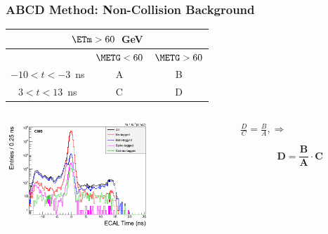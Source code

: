 \documentclass{beamer}
\begin{document}
\begin{frame}
\frametitle{ABCD Method: Non-Collision Background}
 \begin{minipage}[t]{0.8\paperwidth}
\begin{tcolorbox}[colback=blue!5,colframe=UMN@Gold!40,title=\textcolor{UMN@Maroon}{\textcolor{UMN@Maroon}{\textbf{Non-Collision Events.}}}]
  
      \centering
        \begin{tabular}{|c || c|| c|}
        \multicolumn{3}{c}{\bfseries{$\ETm > 60$~GeV}} \\
        \hline 
          & $\METG < 60$ & $\METG > 60$ \\       
          \hline \hline
          $-10 < t < -3$~ns & A &  B \\
          \hline \hline   
          $3 < t < 13$~ns & C &  D \\
        \hline \hline
        \end{tabular} 
\end{tcolorbox}
\end{minipage}
\begin{minipage}[b]{.8\paperwidth} 
  \begin{columns}
   \begin{column}{0.55\linewidth}
     \includegraphics[height=4.0cm,width=0.99\linewidth]{THESISPLOTS/TimeForAll.png} 
   \end{column}
  \begin{column}{0.45\linewidth}
  
      $\frac{D}{C} = \frac{B}{A}, \Rightarrow $
      
      \begin{tcolorbox}[colback=blue!5,colframe=UMN@Gold!40]
         \begin{equation*}
           \mathbf{D = \frac{B}{A}\cdot C }
         \end{equation*}
     \end{tcolorbox}
     \end{column}
    \end{columns}
\end{minipage}
\end{frame}
\end{document}

